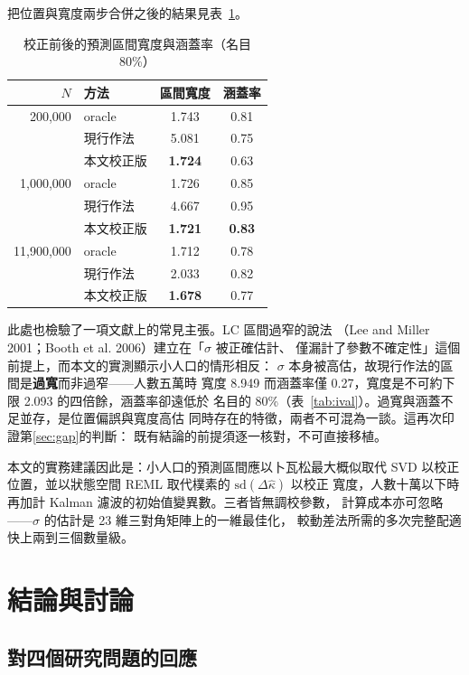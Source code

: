 \documentclass[UTF8, fontset=macnew, a4paper, 12pt]{ctexart}
\begin{document}
把位置與寬度兩步合併之後的結果見表~\ref{tab:calib}。


\begin{table}[H]
\centering
\caption{校正前後的預測區間寬度與涵蓋率（名目 80\%）}
\small
\begin{tabular}{rlcc}
\toprule
$N$ & 方法 & 區間寬度 & 涵蓋率\\
\midrule
200,000 & oracle & 1.743 & 0.81\\
        & 現行作法 & 5.081 & 0.75\\
        & 本文校正版 & \textbf{1.724} & 0.63\\
\midrule
1,000,000 & oracle & 1.726 & 0.85\\
          & 現行作法 & 4.667 & 0.95\\
          & 本文校正版 & \textbf{1.721} & \textbf{0.83}\\
\midrule
11,900,000 & oracle & 1.712 & 0.78\\
           & 現行作法 & 2.033 & 0.82\\
           & 本文校正版 & \textbf{1.678} & 0.77\\
\bottomrule
\end{tabular}
\label{tab:calib}
\end{table}

此處也檢驗了一項文獻上的常見主張。LC 區間過窄的說法
（Lee and Miller 2001；Booth et al. 2006）建立在「$\sigma$ 被正確估計、
僅漏計了參數不確定性」這個前提上，而本文的實測顯示小人口的情形相反：
$\sigma$ 本身被高估，故現行作法的區間是\textbf{過寬}而非過窄——人數五萬時
寬度 8.949 而涵蓋率僅 0.27，寬度是不可約下限 2.093 的四倍餘，涵蓋率卻遠低於
名目的 80\%（表~\ref{tab:ival}）。過寬與涵蓋不足並存，是位置偏誤與寬度高估
同時存在的特徵，兩者不可混為一談。這再次印證第\ref{sec:gap}的判斷：
既有結論的前提須逐一核對，不可直接移植。

本文的實務建議因此是：小人口的預測區間應以卜瓦松最大概似取代 SVD 以校正
位置，並以狀態空間 REML 取代樸素的 $\mathrm{sd}(\Delta\hat\kappa)$ 以校正
寬度，人數十萬以下時再加計 Kalman 濾波的初始值變異數。三者皆無調校參數，
計算成本亦可忽略——$\sigma$ 的估計是 23 維三對角矩陣上的一維最佳化，
較動差法所需的多次完整配適快上兩到三個數量級。

\section{結論與討論}

\subsection{對四個研究問題的回應}
\end{document}
